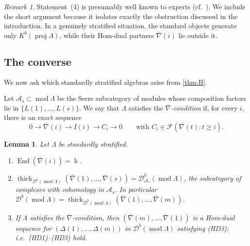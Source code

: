 \documentclass[11pt,reqno]{amsart}
\theoremstyle{plain}
\newtheorem{lemma}[theorem]{Lemma}
\theoremstyle{definition}
\theoremstyle{remark}
\newtheorem{remark}[theorem]{Remark}
\newcommand{\kk}{\Bbbk}
\DeclareMathOperator{\End}{End}
\newcommand{\modd}{\operatorname{mod}}
\newcommand{\proj}{\operatorname{proj}}
\newcommand{\Db}{\mathcal{D}^b}
\newcommand{\Kb}{K^b}
\newcommand{\thick}[2][\cD]{\operatorname{thick}_{#1}(#2)}
\newcommand{\nablabar}{\overline{\nabla}}
\newcommand{\cD}{\mathcal{D}}
\newcommand{\cA}{\mathcal{A}}
\newcommand{\cF}{\mathcal{F}}
\begin{document}
\begin{remark}
Statement~(4) is presumably well known to experts (cf.\ \cite{AHLU00,Dla96}). We include the short argument because it isolates exactly the obstruction discussed in the introduction. In a genuinely stratified situation, the standard objects generate only $\Kb(\proj\Lambda)$, while their Hom-dual partners $\nablabar(i)$ lie outside it.
\end{remark}

\subsection{The converse}
We now ask which standardly stratified algebras arise from \cref{thm:B}.

Let $\cA_s\subset\modd\Lambda$ be the Serre subcategory of modules whose composition factors lie in $\{L(1),\dots,L(s)\}$. We say that $\Lambda$ satisfies the \emph{$\nablabar$-condition} if, for every $i$, there is an exact sequence
\[0\to\nablabar(i)\to I(i)\to C_i\to0\qquad\text{with } C_i\in\cF(\nablabar(t):t\ge i).\]

\begin{lemma}\label{lem:nablabar}
Let $\Lambda$ be standardly stratified.
\begin{enumerate}
\item $\End(\nablabar(i))=\kk$.
\item $\thick[\Db(\modd\Lambda)]{\nablabar(1),\dots,\nablabar(s)}=\Db_{\cA_s}(\modd\Lambda)$, the subcategory of complexes with cohomology in $\cA_s$. In particular $\Db(\modd\Lambda)=\thick[\Db(\modd\Lambda)]{\nablabar(1),\dots,\nablabar(m)}$.
\item If $\Lambda$ satisfies the $\nablabar$-condition, then $(\nablabar(m),\dots,\nablabar(1))$ is a Hom-dual sequence for $(\Delta(1),\dots,\Delta(m))$ in $\Db(\modd\Lambda)$ satisfying (HD3); i.e.\ (HD1)--(HD3) hold.
\end{enumerate}
\end{lemma}
\end{document}
